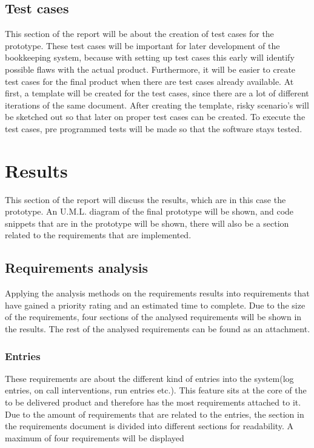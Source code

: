 \documentclass[paper=a4, fontsize=11pt,twoside]{scrartcl}	%
\begin{document}
\subsection{Test cases}
This section of the report will be about the creation of test cases for the prototype. These test cases will be important for later development of the bookkeeping system, because with setting up test cases this early will identify possible flaws with the actual product.
Furthermore, it will be easier to create test cases for the final product when there are test cases already available. At first, a template will be created for the test cases, since there are a lot of different iterations of the same document. After creating the template, risky scenario's will be sketched out so that later on proper test cases can be created. To execute the test cases, pre programmed tests will be made so that the software stays tested. \\






\newpage
\section{Results}
This section of the report will discuss the results, which are in this case the prototype. An U.M.L. diagram of the final prototype will be shown, and code snippets that are in the prototype will be shown, there will also be a section related to the requirements that are implemented.

\subsection{Requirements analysis}
Applying the analysis methods on the requirements results into requirements that have gained a priority rating and an estimated time to complete. Due to the size of the requirements, four sections of the analysed requirements will be shown in the results. The rest of the analysed requirements can be found as an attachment.\\

\subsubsection{Entries}
These requirements are about the different kind of entries into the system(log entries, on call interventions, run entries etc.). This feature sits at the core of the to be delivered product and therefore has the most requirements attached to it. Due to the amount of requirements that are related to the entries, the section in the requirements document is divided into different sections for readability. A maximum of four requirements will be displayed
\end{document}
